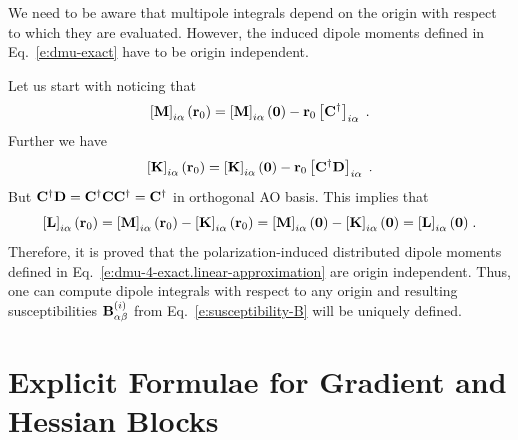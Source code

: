 \documentclass[aip,amsmath,amssymb,reprint]{revtex4-1}
\begin{document}
We need to be aware that multipole integrals depend on the origin with respect to which they are evaluated.
However, the induced dipole moments defined in Eq.~\eqref{e:dmu-exact} 
have to be origin independent. 

Let us start with noticing that
%
\begin{equation}
 \left[ {\bf M} \right]_{i\alpha} ({\bf r}_0) 
 = \left[ {\bf M} \right]_{i\alpha} ({\bf 0}) - {\bf r}_0 \left[ {\bf C}^\dagger \right]_{i\alpha}  \;.
\end{equation}
%
Further we have
%
\begin{equation}
 \left[ {\bf K} \right]_{i\alpha} ({\bf r}_0) 
 = \left[ {\bf K} \right]_{i\alpha} ({\bf 0}) - {\bf r}_0 \left[ {\bf C}^\dagger {\bf D} \right]_{i\alpha} \;.
\end{equation}
%
But ${\bf C}^\dagger {\bf D}={\bf C}^\dagger {\bf C} {\bf C}^\dagger={\bf C}^\dagger$ in orthogonal
AO basis. This implies that
%
\begin{equation}
   \left[ {\bf L} \right]_{i\alpha} ({\bf r}_0) 
 = \left[ {\bf M} \right]_{i\alpha} ({\bf r}_0) - \left[ {\bf K} \right]_{i\alpha} ({\bf r}_0)
 = \left[ {\bf M} \right]_{i\alpha} ({\bf 0})   - \left[ {\bf K} \right]_{i\alpha} ({\bf 0})
 = \left[ {\bf L} \right]_{i\alpha} ({\bf 0}) \;.
\end{equation}
%
Therefore, it is proved that the polarization\hyp{}induced distributed dipole moments 
defined in Eq.~\eqref{e:dmu-4-exact.linear-approximation} 
are origin independent.
Thus, one can compute dipole integrals with respect to any origin and resulting
susceptibilities ${\bf B}_{\alpha\beta}^{(i)}$ from Eq.~\eqref{e:susceptibility-B} will be uniquely defined.

\section{\label{a:blocks} Explicit Formulae for Gradient and Hessian Blocks}
\end{document}
